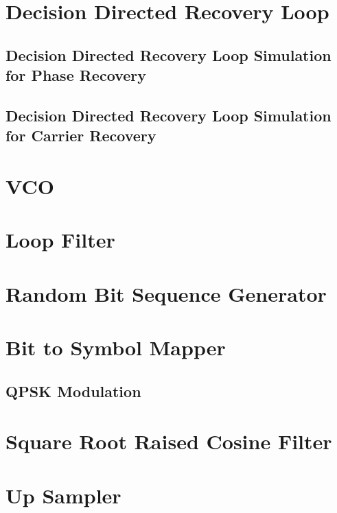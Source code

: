 \documentclass[]{article}
\begin{document}
\section{Decision Directed Recovery Loop}
\subsection{Decision Directed Recovery Loop Simulation for Phase Recovery}


\subsection{Decision Directed Recovery Loop Simulation for Carrier Recovery}


\section{VCO}


\section{Loop Filter}


\section{Random Bit Sequence Generator}
\label{app:random_bit_generator}


\section{Bit to Symbol Mapper}
\label{app:bittosym}

\subsection{QPSK Modulation}
\label{app:qpsk_mod}


\section{Square Root Raised Cosine Filter}
\label{app:sqrt_raised_cosine}


\section{Up Sampler}
\label{app:impulse_train}

\end{document}
